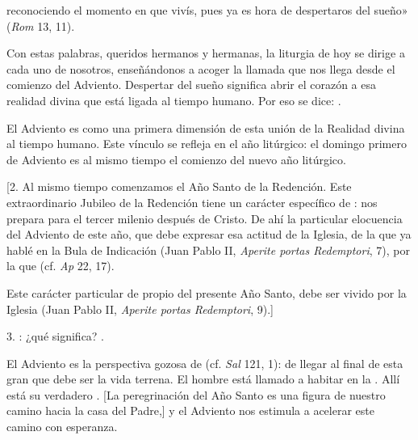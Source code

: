 \begin{body}
	 reconociendo el momento en que vivís, pues ya es hora de despertaros del sueño» (\emph{Rom} 13, 11). 
	
	Con estas palabras, queridos hermanos y hermanas, la liturgia de hoy se dirige a cada uno de nosotros, enseñándonos a acoger la llamada que nos llega desde el comienzo del Adviento. Despertar del sueño significa abrir el corazón a esa realidad divina que está ligada al tiempo humano. Por eso se dice: . 
	
	El Adviento es como una primera dimensión de esta unión de la Realidad divina al tiempo humano. Este vínculo se refleja en el año litúrgico: el domingo primero de Adviento es al mismo tiempo el comienzo del nuevo año litúrgico. 
	
	{[}2. Al mismo tiempo comenzamos el Año Santo de la Redención. Este extraordinario Jubileo de la Redención tiene un carácter específico de : nos prepara para el tercer milenio después de Cristo. De ahí la particular elocuencia del Adviento de este año, que debe expresar esa actitud de la Iglesia, de la que ya hablé en la Bula de Indicación (Juan Pablo II, \emph{Aperite portas Redemptori}, 7), por la que  (cf. \emph{Ap} 22, 17). 
	
	Este carácter particular de  propio del presente Año Santo, debe ser vivido por la Iglesia  (Juan Pablo II, \emph{Aperite portas Redemptori}, 9).{]} 
	
	3. : ¿qué significa? . 
	
	El Adviento es la perspectiva gozosa de  (cf. \emph{Sal} 121, 1): de llegar al final de esta gran  que debe ser la vida terrena. El hombre está llamado a habitar en la . Allí está su verdadero . {[}La peregrinación del Año Santo es una figura de nuestro camino hacia la casa del Padre,{]} y el Adviento nos estimula a acelerar este camino con esperanza. 
	

\end{body}
